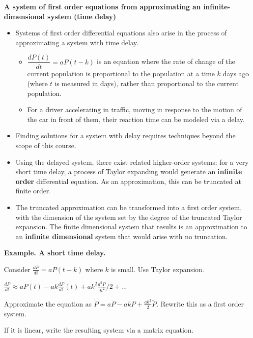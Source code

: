 \documentclass[12pt,letterpaper,noanswers]{exam}
\begin{document}
 \noindent\textbf{A system of first order equations from approximating an infinite-dimensional system (time delay)}
    \begin{tcolorbox}
    \begin{itemize}
    \itemsep0em

    \item Systems of first order differential equations also arise in the process of approximating a system with time delay.  
    \begin{itemize}
    \itemsep0em
        \item $\dfrac{dP(t)}{dt} = aP(t-k)$ is an equation where the rate of change of the current population is proportional to the population at a time $k$ days ago (where $t$ is measured in days), rather than proportional to the current population.
        \item For a driver accelerating in traffic, moving in response to the motion of the car in front of them, their reaction time can be modeled via a delay.
    \end{itemize}
    \item Finding solutions for a system with delay requires techniques beyond the scope of this course.
    \item Using the delayed system, there exist related higher-order systems: for a very short time delay, a process of Taylor expanding would generate an \textbf{infinite order} differential equation.  As an approximation, this can be truncated at finite order.
    \item The truncated approximation can be transformed into a first order system, with the dimension of the system set by the degree of the truncated Taylor expansion.  The finite dimensional system that results is an approximation to an \textbf{infinite dimensional} system that would arise with no truncation.
\end{itemize}
\end{tcolorbox}
\noindent\textbf{Example. A short time delay.}

Consider $\frac{dP}{dt} = aP(t-k)$ where $k$ is small.  Use Taylor expansion.

$\frac{dP}{dt} \approx aP(t) -ak\frac{dP}{dt}(t) +ak^2 \frac{d^2P}{dt^2}/2 + ...$

Approximate the equation as $\dot P = aP - ak\dot P + \frac{ak^2}{2}\ddot P$.  Rewrite this as a first order system.

If it is linear, write the resulting system via a matrix equation.

\vspace{1.7in}
\end{document}
